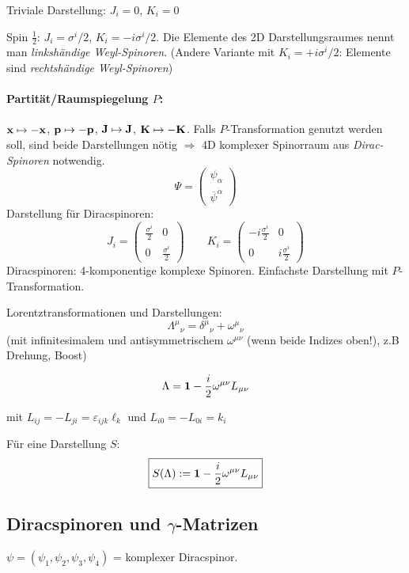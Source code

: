 \documentclass[11pt,a4paper]{report}
\begin{document}
Triviale Darstellung: $J_i=0$, $K_i=0$\par 

Spin $\frac{1}{2}$: $J_i=\sigma^i/2$, $K_i=-i\sigma^i/2$. Die Elemente des 2D Darstellungsraumes nennt man \textit{linkshändige Weyl-Spinoren}. (Andere Variante mit $K_i=+i\sigma^i/2$: Elemente sind \textit{rechtshändige Weyl-Spinoren})\par 

\paragraph{Partität/Raumspiegelung $P$:} $\mathbf{x}\mapsto -\mathbf{x}$, $\mathbf{p}\mapsto -\mathbf{p}$, $\mathbf{J}\mapsto\mathbf{J}$, $\mathbf{K}\mapsto -\mathbf{K}$. Falls $P$-Transformation genutzt werden soll, sind beide Darstellungen nötig $\Rightarrow$ 4D komplexer Spinorraum aus \textit{Dirac-Spinoren} notwendig.
$$\Psi =\begin{pmatrix}
\psi_\alpha \\ \overline{\psi}^{\dot{\alpha}}
\end{pmatrix}$$
Darstellung für Diracspinoren:
$$J_i=\begin{pmatrix}
\frac{\sigma^i}{2} & 0 \\ 0 & \frac{\sigma^i}{2}
\end{pmatrix}\qquad K_i =\begin{pmatrix}
-i\frac{\sigma^i}{2} & 0 \\ 0 & i\frac{\sigma^i}{2}
\end{pmatrix}$$
Diracspinoren: 4-komponentige komplexe Spinoren. Einfachste Darstellung mit $P$-Transformation.\par 

Lorentztransformationen und Darstellungen:
$${\Lambda^\mu}_\nu = {\delta^\mu}_\nu +{\omega^\mu}_\nu$$
(mit infinitesimalem und antisymmetrischem $\omega^{\mu\nu}$ (wenn beide Indizes oben!), z.B Drehung, Boost)

$$\Lambda = \mathbf{1} -\frac{i}{2}\omega^{\mu\nu}L_{\mu\nu}$$

mit $L_{ij} = -L_{ji} = \varepsilon_{ijk}\ell_k$ und $L_{i0}=-L_{0i}=k_i$

Für eine Darstellung $S$:
$$\boxed{S(\Lambda ) := \mathbf{1}-\frac{i}{2}\omega^{\mu\nu}L_{\mu\nu}}$$

\subsection{Diracspinoren und $\gamma$-Matrizen}
$\psi = (\psi_1,\psi_2,\psi_3,\psi_4)$ = komplexer Diracspinor.\par 
\end{document}
